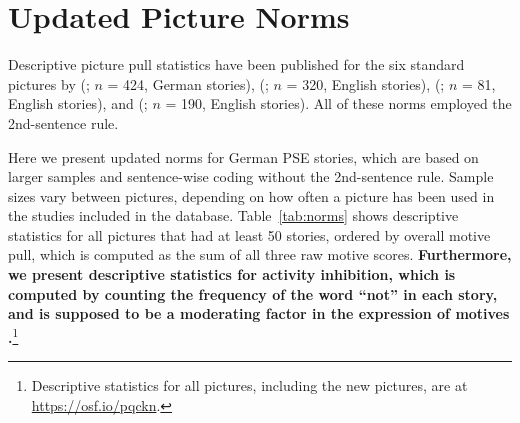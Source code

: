 \documentclass[man,a4paper,mask]{apa6}\usepackage[]{graphicx}\usepackage[]{color}
\newcommand{\added}[1]{\textcolor{colour_added}{\bf{#1}}}
\begin{document}
\section{Updated Picture Norms}

Descriptive picture pull statistics have been published for the six standard pictures by \citeauthor{schultheiss_AssessmentImplicitMotives_2001} (\citeyear{schultheiss_AssessmentImplicitMotives_2001}; $n$ = 424, German stories), \citeauthor{pang_assessing_2005} (\citeyear{pang_assessing_2005}; $n$ = 320, English stories), \citeauthor{pang_ContentCodingMethods_2010} (\citeyear{pang_ContentCodingMethods_2010}; $n$ = 81, English stories), and \citeauthor{schultheiss_AreImplicitExplicit_2009} (\citeyear{schultheiss_AreImplicitExplicit_2009}; $n$ = 190, English stories). All of these norms employed the 2nd-sentence rule.

Here we present updated norms for German PSE stories, which are based on larger samples and sentence-wise coding without the 2nd-sentence rule. Sample sizes vary between pictures, depending on how often a picture has been used in the studies included in the database. Table~\ref{tab:norms} shows descriptive statistics for all pictures that had at least 50 stories, ordered by overall motive pull, which is computed as the sum of all three raw motive scores. \added{Furthermore, we present descriptive statistics for activity inhibition, which is computed by counting the frequency of the word ``not'' in each story, and is supposed to be a moderating factor in the expression of motives \parencite{langens_ActivityInhibition_2010}.}\footnote{Descriptive statistics for all pictures, including the new pictures, are at \url{https://osf.io/pqckn}.}
\end{document}
